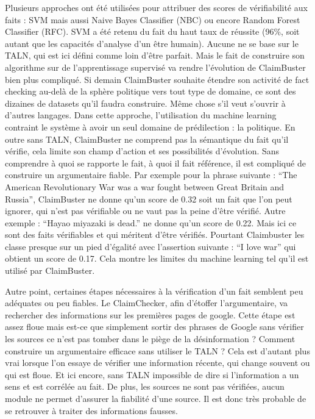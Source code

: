 Plusieurs approches ont été utilisées pour attribuer des scores de vérifiabilité aux faits : SVM mais aussi Naive Bayes Classifier (NBC) ou encore Random Forest Classifier (RFC). SVM a été retenu du fait du haut taux de réussite (96\%, soit autant que les capacités d'analyse d'un être humain). Aucune ne se base sur le TALN, qui est ici défini comme loin d'être parfait. Mais le fait de construire son algorithme sur de l'apprentissage supervisé va rendre l'évolution de ClaimBuster bien plus compliqué. Si demain ClaimBuster souhaite étendre son activité de fact checking au-delà de la sphère politique vers tout type de domaine, ce sont des dizaines de datasets qu'il faudra construire. Même chose s'il veut s'ouvrir à d'autres langages. Dans cette approche, l'utilisation du machine learning contraint le système à avoir un seul domaine de prédilection : la politique. En outre sans TALN, ClaimBuster ne comprend pas la sémantique du fait qu'il vérifie, cela limite son champ d'action et ses possibilités d'évolution. Sans comprendre à quoi se rapporte le fait, à quoi il fait référence, il est compliqué de construire un argumentaire fiable. Par exemple pour la phrase suivante : \enquote{The American Revolutionary War was a war fought between Great Britain and Russia}, ClaimBuster ne donne qu'un score de 0.32 soit un fait que l'on peut ignorer, qui n'est pas vérifiable ou ne vaut pas la peine d'être vérifié. Autre exemple : \enquote{Hayao miyazaki is dead.} ne donne qu'un score de 0.22. Mais ici ce sont des faits vérifiables et qui méritent d'être vérifiés. Pourtant Claimbuster les classe presque sur un pied d'égalité avec l'assertion suivante : \enquote{I love war} qui obtient un score de 0.17. Cela montre les limites du machine learning tel qu'il est utilisé par ClaimBuster.

Autre point, certaines étapes nécessaires à la vérification d'un fait semblent peu adéquates ou peu fiables. Le ClaimChecker, afin d'étoffer l'argumentaire, va rechercher des informations sur les premières pages de google. Cette étape est assez floue mais est-ce que simplement sortir des phrases de Google sans vérifier les sources ce n'est pas tomber dans le piège de la désinformation ? Comment construire un argumentaire efficace sans utiliser le TALN ? Cela est d'autant plus vrai lorsque l'on essaye de vérifier une information récente, qui change souvent ou qui est floue. Et ici encore, sans TALN impossible de dire si l'information a un sens et est corrélée au fait. De plus, les sources ne sont pas vérifiées, aucun module ne permet d'assurer la fiabilité d'une source. Il est donc très probable de se retrouver à traiter des informations fausses.

